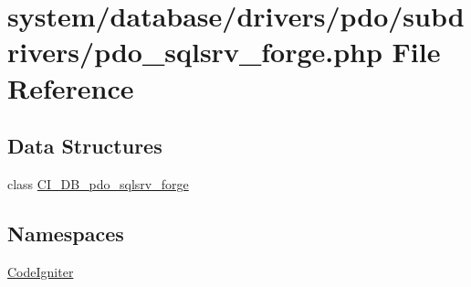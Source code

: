 \hypertarget{pdo__sqlsrv__forge_8php}{}\section{system/database/drivers/pdo/subdrivers/pdo\+\_\+sqlsrv\+\_\+forge.php File Reference}
\label{pdo__sqlsrv__forge_8php}
\subsection*{Data Structures}
\begin{DoxyCompactItemize}
\item 
class \mbox{\hyperlink{class_c_i___d_b__pdo__sqlsrv__forge}{C\+I\+\_\+\+D\+B\+\_\+pdo\+\_\+sqlsrv\+\_\+forge}}
\end{DoxyCompactItemize}
\subsection*{Namespaces}
\begin{DoxyCompactItemize}
\item 
 \mbox{\hyperlink{namespace_code_igniter}{Code\+Igniter}}
\end{DoxyCompactItemize}
